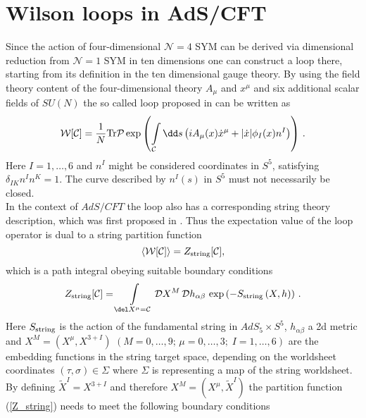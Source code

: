 \section{Wilson loops in AdS/CFT}
Since the action of four-dimensional $\mathcal{N}=4$ SYM can be derived via dimensional reduction from $\mathcal{N}=1$ SYM in ten dimensions \cite{BRINK197777} one can construct a  loop there, starting from its definition in the ten dimensional gauge theory. By using the field theory content of the four-dimensional theory $A_{\mu}$ and $x^{\mu}$ and six additional scalar fields of $SU(N)$ the so called  loop proposed in \cite{maldacena2} can be written as
%
%
\begin{equation}
\mathcal{W}[\mathcal{C}] = \frac{1}{N}{\rm Tr}\mathcal{P} \exp \left( \int\limits_{\mathcal{C}} \dd s \left( i A_{\mu}(x)\dot{x}^{\mu} +
\vert \dot{x}\vert \phi_{I}(x) n^{I} \right) \right) \,.
\end{equation}
%
%
Here $I=1,\ldots,6$ and $n^{I}$ might be considered coordinates in $S^{5}$, satisfying $\delta_{IK}n^{I}n^{K}=1$. The curve described by $n^{I}(s)$ in $S^{5}$ must not necessarily be closed. \\
%
%
In the context of $AdS/CFT$ the  loop also has a corresponding string theory description, which was first proposed in \cite{maldacena2}. Thus the expectation value of the  loop operator is dual to a string partition function
%
%
\begin{equation}
\langle \mathcal{W}[\mathcal{C}]\rangle = Z_{\rm string}[\mathcal{C}],
\label{W_Z}
\end{equation}
%
%
which is a path integral obeying suitable boundary conditions
%
%
\begin{equation}
Z_{\rm string}[\mathcal{C}] = \int\limits_{\del X^{\mu}=\mathcal{C}} \mathcal{D}X^{M}\, \mathcal{D}h_{\alpha\beta}\, \exp \left(-S_{\rm string}\left( X,h \right) \right)\,.
\label{Z_string}
\end{equation}
%
%
Here $S_{\rm string}$ is the action of the fundamental string in $AdS_{5}\times S^{5}$, $h_{\alpha\beta}$ a 2d metric and ${X^{M}=(X^{\mu},X^{3+I})}$ ${(M=0,\ldots,9;\, \mu=0,\ldots,3; \; I=1,\ldots,6)}$ are the embedding functions in the string target space, depending on the worldsheet coordinates $(\tau,\sigma)\in \Sigma$ where $\Sigma$ is representing a map of the string worldsheet. By defining $\widetilde{X}^{I}=X^{3+I}$ and therefore $X^{M}=(X^{\mu},\widetilde{X}^{I})$ the partition function (\ref{Z_string}) needs to meet the following boundary conditions
